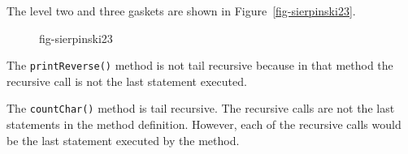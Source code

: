 \begin{ANS}
\item  The level two and three gaskets are shown in Figure~\ref{fig-sierpinski23}.

\begin{figure}[tb]
{fig-sierpinski23}
\end{figure}

\item  The {\tt printReverse()} method is not tail recursive because in that
method the recursive call is not the last statement executed.

\item  The {\tt countChar()} method is tail recursive.  The recursive calls
are not the last statements in the method definition.  However, each of
the recursive calls would be the last statement executed by the
method.

\end{ANS}


